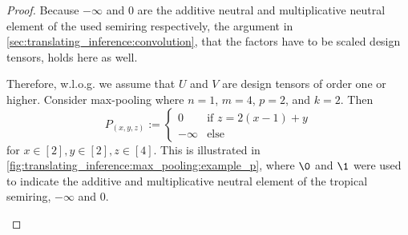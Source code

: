 \begin{proof}
    Because $-\infty$ and $0$ are the additive neutral and multiplicative neutral element of the used semiring respectively,
    the argument in \cref{sec:translating_inference:convolution}, that the factors have to be scaled design tensors, holds here as well.

    Therefore, w.l.o.g. we assume that $U$ and $V$ are design tensors of order one or higher.
    Consider max-pooling where $n = 1$, $m = 4$, $p = 2$, and $k = 2$.
    Then
    $$P_{(x,y,z)} := \begin{cases}
        0 & \text{if } z = 2 (x - 1) + y\\
        -\infty & \text{else}
    \end{cases}$$
    for $x \in [2], y \in [2], z \in [4]$.
    This is illustrated in \cref{fig:translating_inference:max_pooling:example_p}, where $\0$ and $\1$ were used to indicate the additive and multiplicative neutral element of the tropical semiring, $-\infty$ and $0$.
    \begin{figure}
        \centering
\end{figure}
\end{proof}

